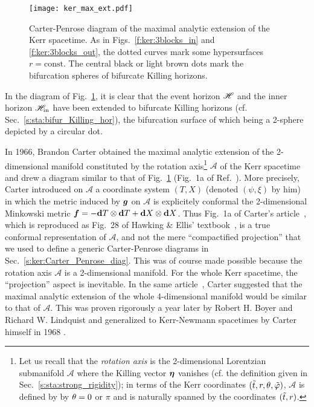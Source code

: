 \begin{figure}
\centerline{\texttt{[image: ker\_max\_ext.pdf]}}
\caption[]{\label{f:ker:max_ext} \footnotesize
Carter-Penrose diagram of the maximal
analytic extension of the Kerr spacetime. As in Figs.~\ref{f:ker:3blocks_in}
and \ref{f:ker:3blocks_out},
the dotted curves mark some hypersurfaces $r=\mathrm{const}$.
The central black or light brown dots mark the bifurcation spheres of bifurcate Killing horizons.}
\end{figure}

In the diagram of Fig.~\ref{f:ker:max_ext}, it is clear that the event horizon
$\mathscr{H}$ and the inner horizon $\mathscr{H}_{\rm in}$ have been extended to
bifurcate Killing horizons (cf. Sec.~\ref{s:sta:bifur_Killing_hor}), the bifurcation surface of which being a 2-sphere depicted by a circular dot.

\begin{hist} \label{h:ker:max_ext_diag}
In 1966, Brandon Carter \cite{Carte66} obtained the maximal analytic extension
of the 2-dimensional manifold constituted by the rotation
axis\footnote{Let us recall that the \emph{rotation axis} is the 2-dimensional Lorentzian
submanifold $\mathscr{A}$ where the Killing vector $\bm{\eta}$ vanishes
(cf. the definition given in Sec.~\ref{s:sta:strong_rigidity});
in terms of the Kerr coordinates $({\tilde t}, r, \theta, {\tilde\varphi})$, $\mathscr{A}$ is defined by
by $\theta=0$ or $\pi$ and is naturally spanned by the coordinates
$({\tilde t}, r)$.} $\mathscr{A}$
of the Kerr spacetime and drew a diagram similar to that of
Fig.~\ref{f:ker:max_ext} (Fig.~1a of Ref.~\cite{Carte66}). More precisely,
Carter introduced on $\mathscr{A}$ a coordinate system $(T,X)$ (denoted $(\psi,\xi)$ by him)
in which the metric induced by $\bm{g}$
on $\mathscr{A}$ is explicitely conformal the 2-dimensional Minkowski metric
$\bm{f} = -\mathbf{d} T\otimes \mathbf{d} T + \mathbf{d} X\otimes \mathbf{d} X$. Thus Fig.~1a of Carter's article~\cite{Carte66},
which is reproduced as Fig.~28 of Hawking \& Ellis' textbook~\cite{HawkiE73}, is a true
conformal representation of $\mathscr{A}$, and not the mere ``compactified projection''
that we used to define a generic Carter-Penrose diagrams in Sec.~\ref{s:ker:Carter_Penrose_diag}.
This was of course made possible because the rotation axis $\mathscr{A}$ is
a 2-dimensional manifold. For the whole Kerr spacetime, the ``projection'' aspect is inevitable.
In the same article~\cite{Carte66}, Carter suggested that the maximal analytic extension of the whole 4-dimensional manifold would be similar to that of $\mathscr{A}$.
This was proven rigorously a year later by
Robert H. Boyer and Richard W. Lindquist \cite{BoyerL67}
and generalized to Kerr-Newmann spacetimes by Carter himself in 1968 \cite{Carte68a}.
\end{hist}

